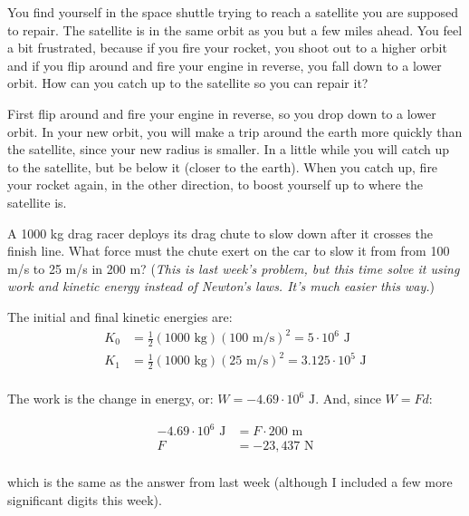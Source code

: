 \documentclass{exam}
\begin{document}
\begin{questions}

\question 
You find yourself in the space shuttle trying to reach a satellite you are supposed to repair.  The
satellite is in the same orbit as you but a few miles ahead.  You feel a bit frustrated, because if you fire your
rocket, you shoot out to a higher orbit and if you flip around and fire your engine in reverse, you
fall down to a lower orbit.  How can you catch up to the satellite so you can repair it?

\begin{solution}
  First flip around and fire your engine in reverse, so you drop down to a lower orbit.  In your new orbit, you will make
  a trip around the earth more quickly than the satellite, since your new radius is smaller.  In a little while you will
  catch up to the satellite, but be below it (closer to the earth).  When you catch up, fire your rocket again, in the
  other direction, to boost yourself up to where the satellite is.
\end{solution}

\question 
A 1000 kg drag racer deploys its drag chute to slow down after it crosses the finish line.  What force must
the chute exert on the car to slow it from from 100 m/s to 25 m/s in 200 m?  ({\em This is last week's problem, but this
time solve it using work and kinetic energy instead of Newton's laws.  It's much easier this way.})

\begin{solution}

The initial and final kinetic energies are:
\begin{align*}
  K_0 &= \frac{1}{2} (1000 \text{ kg})(100 \text{ m/s})^2 = 5 \cdot 10^6 \text{ J} \\
  K_1 &= \frac{1}{2} (1000 \text{ kg})(25 \text{ m/s})^2 =  3.125 \cdot 10^5 \text{ J} \\
\end{align*}

The work is the change in energy, or: $W = - 4.69 \cdot 10^6 \text{ J}$.  And, since $W = Fd$:

\begin{align*}
  - 4.69 \cdot 10^6 \text{ J} &= F \cdot 200 \text{ m} \\
  F &= -23,437 \text{ N} \\
\end{align*}

which is the same as the answer from last week (although I included a few more significant digits this week).


\end{solution}
\end{questions}
\end{document}
